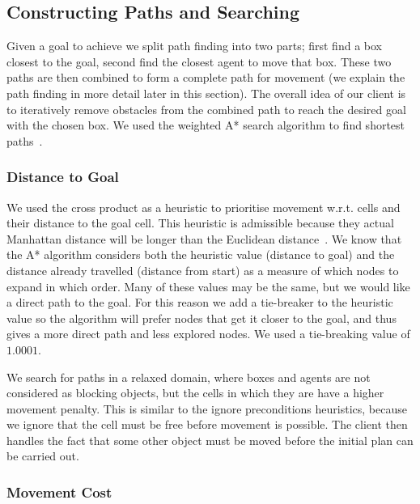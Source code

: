 \subsection{Constructing Paths and Searching}
\label{sec:constructing paths and searching}

Given a goal to achieve we split path finding into two parts; first find a box closest to the goal, second find the closest agent to move that box.
These two paths are then combined to form a complete path for movement (we explain the path finding in more detail later in this section).
The overall idea of our client is to iteratively remove obstacles from the combined path to reach the desired goal with the chosen box.
We used the weighted A* search algorithm to find shortest paths~\cite{pathfinding2016redblobgames,russell2009modern}.

\subsubsection{Distance to Goal}

We used the cross product as a heuristic to prioritise movement w.r.t. cells and their distance to the goal cell.
This heuristic is admissible because they actual Manhattan distance will be longer than the Euclidean distance~\cite{russell2009modern}.
We know that the A* algorithm considers both the heuristic value (distance to goal) and the distance already travelled (distance from start) as a measure of which nodes to expand in which order.
Many of these values may be the same, but we would like a direct path to the goal.
For this reason we add a tie-breaker to the heuristic value so the algorithm will prefer nodes that get it closer to the goal, and thus gives a more direct path and less explored nodes.
We used a tie-breaking value of $1.0001$.~\cite{pathfinding2016redblobgames}

We search for paths in a relaxed domain, where boxes and agents are not considered as blocking objects, but the cells in which they are have a higher movement penalty.
This is similar to the ignore preconditions heuristics, because we ignore that the cell must be free before movement is possible.
The client then handles the fact that some other object must be moved before the initial plan can be carried out.

\subsubsection{Movement Cost}

